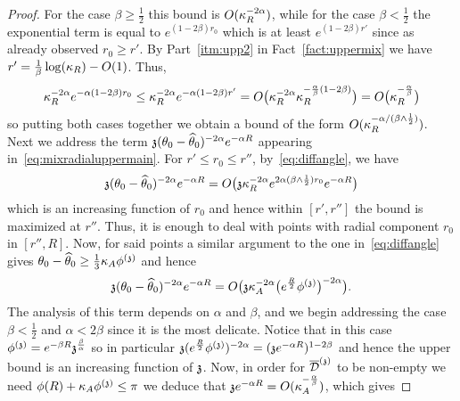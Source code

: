 \begin{proof}
For the case $\beta\geq\frac{1}{2}$ this bound is $O(\KR^{-2\alpha})$, while for the case $\beta<\frac{1}{2}$ the exponential term is equal to $e^{(1-2\beta)r_0}$ which is at least $e^{(1-2\beta)r'}$ since as already observed $r_0\ge r'$. By Part~\eqref{itm:upp2} in Fact~\ref{fact:uppermix} we have $r'=\frac{1}{\beta}\log(\KR)-O(1)$. Thus,
\[\KR^{-2\alpha}e^{-\alpha(1-2\beta)r_0}\leq \KR^{-2\alpha}e^{-\alpha(1-2\beta)r'}=O\big(\KR^{-2\alpha}\KR^{-\frac{\alpha}{\beta}(1-2\beta)}\big)=O\big(\KR^{-\frac{\alpha}{\beta}}\big)\]
so putting both cases together we obtain a bound of the form $O(\KR^{-\alpha/(\beta\wedge\frac12)})$. 
Next we address the term $\ss(\theta_0-\hatt)^{-2\alpha}e^{-\alpha R}$ appearing in~\eqref{eq:mixradialuppermain}. For $r'\le r_0\le r''$, by~\eqref{eq:diffangle}, we have
\[\ss(\theta_0-\hatt)^{-2\alpha}e^{-\alpha R}=O\big(\ss\KR^{-2\alpha}e^{2\alpha(\beta\wedge \frac12)r_0}e^{-\alpha R}\big)\]
which is an increasing function of $r_0$ and hence within $[r',r'']$ the bound is maximized at $r''$. Thus, it is enough to deal with points with radial component $r_0$ in $[r'',R]$. Now, for said points a similar argument to the one in~\eqref{eq:diffangle} gives $\theta_0-\hatt\geq\tfrac{1}{3}\KA \phis$ and hence
\[\ss(\theta_0-\hatt)^{-2\alpha}e^{-\alpha R}=O\big(\ss\KA^{-2\alpha}\big(e^{\frac{R}{2}}\phis\big)^{-2\alpha}\big).\]
The analysis of this term depends on $\alpha$ and $\beta$, and we begin addressing the case $\beta<\frac{1}{2}$ and $\alpha<2\beta$ since it is the most delicate. Notice that in this case $\phis=e^{-\beta R}\ss^{\frac{\beta}{\alpha}}$ so in particular $\ss(e^{\frac{R}{2}}\phis)^{-2\alpha}=(\ss e^{-\alpha R})^{1-2\beta}$ and hence the upper bound is an increasing function of $\ss$. Now, in order for $\ndt$ to be non-empty we need $\phi(R)+\KA\phis\leq\pi$ we deduce that $\ss e^{-\alpha R}=O(\KA^{-\frac{\alpha}{\beta}})$, which gives 

\end{proof}

